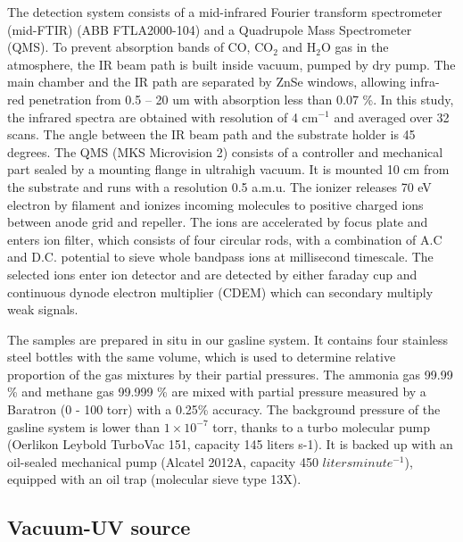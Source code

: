 The detection system consists of a mid-infrared Fourier transform spectrometer (mid-FTIR) (ABB FTLA2000-104) and a Quadrupole Mass Spectrometer (QMS). To prevent absorption bands of CO, CO$_2$ and H$_2$O gas in the atmosphere, the IR beam path is built inside vacuum, pumped by dry pump. The main chamber and the IR path are separated by ZnSe windows, allowing infra-red penetration from 0.5 – 20 um with absorption less than 0.07 \%. In this study, the infrared spectra are obtained with resolution of 4 cm$^{-1}$ and averaged over 32 scans. The angle between the IR beam path and the substrate holder is 45 degrees. The QMS (MKS Microvision 2) consists of a controller and mechanical part sealed by a mounting flange in ultrahigh vacuum. It is mounted 10 cm from the substrate and runs with a resolution 0.5 a.m.u. The ionizer releases 70 eV electron by filament and ionizes incoming molecules to positive charged ions between anode grid and repeller. The ions are accelerated by focus plate and enters ion filter, which consists of four circular rods, with a combination of A.C and D.C. potential to sieve whole bandpass ions at millisecond timescale. The selected ions enter ion detector and are detected by either faraday cup and continuous dynode electron multiplier (CDEM) which can secondary multiply weak signals.

The samples are prepared in situ in our gasline system. It contains four stainless steel bottles with the same volume, which is used to determine relative proportion of the gas mixtures by their partial pressures. The ammonia gas 99.99 \% and methane gas 99.999 \% are mixed with partial pressure measured by a Baratron (0 - 100 torr) with a 0.25\% accuracy. The background pressure of the gasline system is lower than $1 \times 10^{-7}$ torr, thanks to a turbo molecular pump (Oerlikon Leybold TurboVac 151, capacity 145 liters s-1). It is backed up with an oil-sealed mechanical pump (Alcatel 2012A, capacity 450 $liters minute^{-1}$), equipped with an oil trap (molecular sieve type 13X).

\subsection{Vacuum-UV source}
\label{sec:Vacuum_UV_source}

